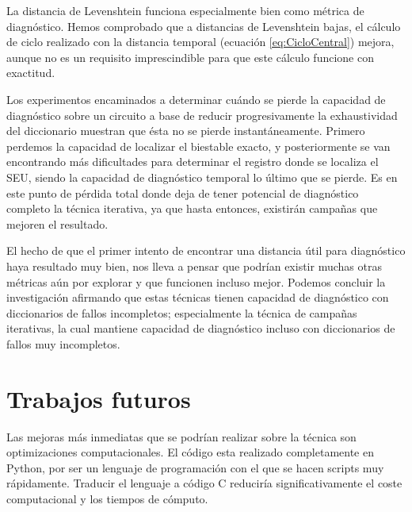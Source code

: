 La distancia de Levenshtein funciona especialmente bien como métrica de
diagnóstico. Hemos comprobado que a distancias de Levenshtein bajas, el cálculo de
ciclo realizado con la distancia temporal (ecuación \ref{eq:CicloCentral}) mejora,
aunque no es un requisito imprescindible para que este cálculo funcione con
exactitud.

Los experimentos encaminados a determinar cuándo se pierde la capacidad de
diagnóstico sobre un circuito a base de reducir progresivamente la exhaustividad
del diccionario muestran que ésta no se pierde instantáneamente. Primero perdemos
la capacidad de localizar el biestable exacto, y posteriormente se van encontrando
más dificultades para determinar el registro donde se localiza el \gls{SEU},
siendo la capacidad de diagnóstico temporal lo último que se pierde. Es en este
punto de pérdida total donde deja de tener potencial de diagnóstico completo la
técnica iterativa, ya que hasta entonces, existirán campañas que mejoren el
resultado.

El hecho de que el primer intento de encontrar una distancia útil para diagnóstico
haya resultado muy bien, nos lleva a pensar que podrían existir muchas otras
métricas aún por explorar y que funcionen incluso mejor.
Podemos concluir la investigación afirmando que estas técnicas tienen capacidad de
diagnóstico con diccionarios de fallos incompletos; especialmente la técnica de 
campañas iterativas, la cual mantiene capacidad de diagnóstico incluso con 
diccionarios de fallos muy incompletos.

\section{Trabajos futuros}
\label{sec:TrabajosFuturos}
Las mejoras más inmediatas que se podrían realizar sobre la técnica son
optimizaciones computacionales. El código esta realizado completamente en Python,
por ser un lenguaje de programación con el que se hacen scripts muy rápidamente.
Traducir el lenguaje a código C reduciría significativamente el coste
computacional y los tiempos de cómputo.

